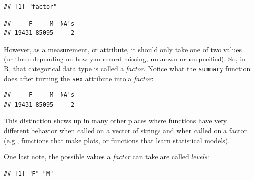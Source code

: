 \documentclass[]{book}
\newenvironment{Shaded}{\begin{snugshade}}{\end{snugshade}}
\newcommand{\KeywordTok}[1]{\textcolor[rgb]{0.13,0.29,0.53}{\textbf{#1}}}
\newcommand{\StringTok}[1]{\textcolor[rgb]{0.31,0.60,0.02}{#1}}
\newcommand{\OperatorTok}[1]{\textcolor[rgb]{0.81,0.36,0.00}{\textbf{#1}}}
\newcommand{\NormalTok}[1]{#1}
\theoremstyle{definition}
\theoremstyle{definition}
\theoremstyle{remark}
\begin{document}
\begin{verbatim}
## [1] "factor"
\end{verbatim}

\begin{Shaded}
\end{Shaded}

\begin{verbatim}
##     F     M  NA's 
## 19431 85095     2
\end{verbatim}

However, as a measurement, or attribute, it should only take one of two
values (or three depending on how you record missing, unknown or
unspecified). So, in R, that categorical data type is called a
\emph{factor}. Notice what the \texttt{summary} function does after
turning the \texttt{sex} attribute into a \emph{factor}:

\begin{Shaded}
\end{Shaded}

\begin{verbatim}
##     F     M  NA's 
## 19431 85095     2
\end{verbatim}

This distinction shows up in many other places where functions have very
different behavior when called on a vector of strings and when called on
a factor (e.g., functions that make plots, or functions that learn
statistical models).

One last note, the possible values a \emph{factor} can take are called
\emph{levels}:

\begin{Shaded}
\end{Shaded}

\begin{verbatim}
## [1] "F" "M"
\end{verbatim}
\end{document}
